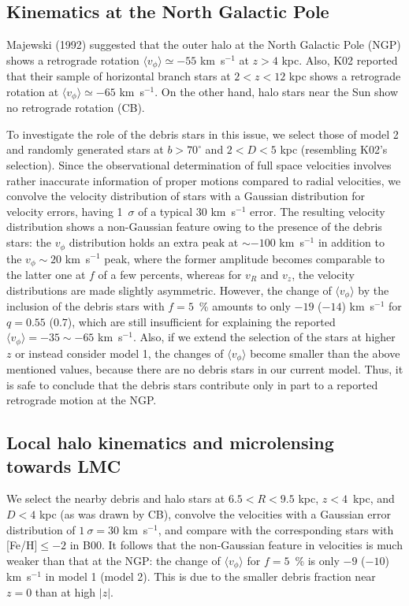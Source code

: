 \documentclass[preprint,12pt]{aastex}
\begin{document}
\subsection{Kinematics at the North Galactic Pole}

Majewski (1992) suggested that the outer halo at the North Galactic Pole (NGP)
shows a retrograde rotation $\langle v_\phi \rangle \simeq -55$ km~s$^{-1}$
at $z>4$ kpc. Also, K02 reported that their sample of
horizontal branch stars at $2<z<12$ kpc shows a retrograde
rotation at $\langle v_\phi \rangle \simeq -65$ km~s$^{-1}$.
On the other hand, halo stars near the Sun 
show no retrograde rotation (CB).

To investigate the role of the debris stars in this issue, we select
those of model 2 and randomly generated stars at $b>70^\circ$ and
$2<D<5$ kpc (resembling K02's selection). Since the observational determination
of full space velocities involves rather
inaccurate information of proper motions compared to radial velocities,
we convolve the velocity distribution of stars with a Gaussian
distribution for velocity errors, having 1~$\sigma$ of a typical
30 km~s$^{-1}$ error.
The resulting velocity distribution shows a non-Gaussian feature owing to
the presence of the debris stars: the $v_\phi$ distribution holds an extra
peak at $\sim -100$ km~s$^{-1}$ in addition to the
$v_\phi \sim 20$ km~s$^{-1}$ peak, where the former amplitude becomes
comparable to the latter one at $f$ of a few percents,
whereas for $v_R$ and $v_z$, the velocity distributions are made slightly
asymmetric. However, the change of $\langle v_\phi \rangle$ by the inclusion
of the debris stars with $f=5$~\% amounts to only $-19$ ($-14$) km~s$^{-1}$
for $q=0.55$ ($0.7$), which are still insufficient for explaining
the reported $\langle v_\phi \rangle = -35 \sim -65$ km~s$^{-1}$.
Also, if we extend the selection of the stars at higher $z$ or instead consider
model 1, the changes of $\langle v_\phi \rangle$ become smaller than the above
mentioned values, because there are no debris stars in our current model.
Thus, it is safe to conclude that the debris stars
contribute only in part to a reported retrograde motion at the NGP.


\subsection{Local halo kinematics and microlensing towards LMC}

We select the nearby debris and halo stars at $6.5<R<9.5$ kpc, $z<4$~kpc,
and $D<4$ kpc (as was drawn by CB), convolve the velocities
with a Gaussian error distribution of $1~\sigma = 30$ km~s$^{-1}$, and
compare with the corresponding stars with [Fe/H]$\le-2$ in B00.
It follows that the non-Gaussian feature in velocities
is much weaker than that at the
NGP: the change of $\langle v_\phi \rangle$ for $f=5$~\% is only
$-9$ ($-10$) km~s$^{-1}$ in model 1 (model 2). This is due to
the smaller debris fraction near $z=0$ than at high $|z|$.
\end{document}
